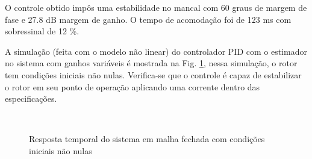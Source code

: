 O controle obtido impôs uma estabilidade no mancal com 60 graus de margem de fase e 27.8 dB margem de ganho. O tempo de acomodação foi de 123 ms com sobressinal de 12 \%. 

A simulação (feita com o modelo não linear) do controlador PID  com o estimador no sistema com ganhos variáveis é mostrada na Fig. \ref{fig:pid_nlinear_degrau}, nessa simulação, o rotor tem condições iniciais não nulas. Verifica-se que o controle é capaz de estabilizar o rotor em seu ponto de operação aplicando uma corrente dentro das especificações.

\begin{figure}[!ht]
	\centering
		\\
		\caption{Resposta temporal do sistema em malha fechada com condições iniciais não nulas}
		\label{fig:pid_nlinear_degrau}
\end{figure}
